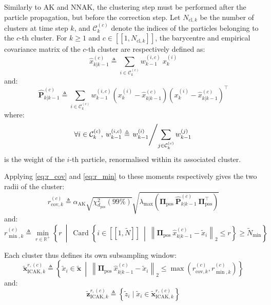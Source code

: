 Similarly to AK and NNAK, the clustering step must be performed after the particle propagation, but before the correction step. Let $N_{\mathrm{cl},k}$ be the number of clusters at time step $k$, and $\mathcal{C}_k^{(c)}$ denote the indices of the particles belonging to the $c$-th cluster. For $k\geq1$ and $c\in[\![1,N_{\mathrm{cl},k}]\!]$, the barycentre and empirical covariance matrix of the $c$-th cluster are respectively defined as:
\begin{equation}
	\hat{x}_{k|k-1}^{(c)}\triangleq\sum_{i\in\mathcal{C}_k^{(c)}}w_{k-1}^{(i,c)}\:x_k^{(i)}
\end{equation}
and:
\begin{equation}
	\hat{\mathbf{P}}_{k|k-1}^{(c)}\triangleq\sum_{i\in\mathcal{C}_k^{(c)}}w_{k-1}^{(i,c)}\left(x_k^{(i)}-\hat{x}_{k|k-1}^{(c)}\right)\left(x_k^{(i)}-\hat{x}_{k|k-1}^{(c)}\right)^\top
\end{equation}
where:
\begin{equation}
	\forall i\in\mathcal{C}_k^{(c)},\:w_{k-1}^{(i,c)}\triangleq\left.w_{k-1}^{(i)}\middle/\sum_{j\in\mathcal{C}_k^{(c)}}w_{k-1}^{(j)}\right.
\end{equation}
is the weight of the $i$-th particle, renormalised within its associated cluster.

Applying \eqref{eq:r_cov} and \eqref{eq:r_min} to these moments respectively gives the two radii of the cluster:
\begin{equation}
	r_{\mathrm{cov},k}^{(c)}\triangleq\alpha_{\mathrm{AK}}\sqrt{\chi_{d_{\mathrm{pos}}}^2(99\%)}\sqrt{\lambda_{\max}\left(\boldsymbol{\Pi}_{\mathrm{pos}}\:\hat{\mathbf{P}}_{k|k-1}^{(c)}\:\boldsymbol{\Pi}_{\mathrm{pos}}^\top\right)}
\end{equation}
and:
\begin{equation}
	r_{\min,k}^{(c)}\triangleq\underset{r\in\mathbb{R}^+}{\min}\left\{r\:\middle|\:\operatorname{Card}\left\{i\in[\![1,\tilde{N}]\!]\:\middle|\:\left\|\boldsymbol{\Pi}_{\mathrm{pos}}\:\hat{x}_{k|k-1}^{(c)}-\tilde{x}_i\right\|_2\leq r\right\}\geq\tilde{N}_{\min}\right\}
\end{equation}

Each cluster thus defines its own subsampling window:
\begin{equation}
	\tilde{\mathbf{x}}_{\mathrm{ICAK},k}^{r,(c)}\triangleq\left\{\tilde{x}_i\in\tilde{\mathbf{x}}\:\middle|\:\left\|\boldsymbol{\Pi}_{\mathrm{pos}}\:\hat{x}_{k|k-1}^{(c)}-\tilde{x}_i\right\|_2\leq\max\left(r_{\mathrm{cov},k}^{(c)},r_{\min,k}^{(c)}\right)\right\}\label{eq:ICAK_window}
\end{equation}
and:
\begin{equation}
	\tilde{\mathbf{z}}_{\mathrm{ICAK},k}^{r,(c)}\triangleq\left\{\tilde{z}_i\mid\tilde{x}_i\in\tilde{\mathbf{x}}_{\mathrm{ICAK},k}^{r,(c)}\right\}
\end{equation}

